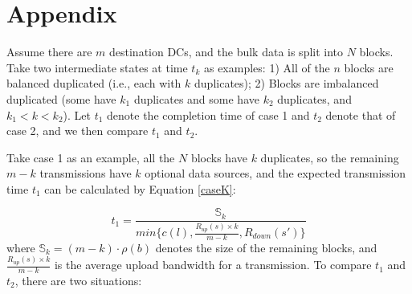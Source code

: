 \section{Appendix}
Assume there are $m$ destination DCs, and the bulk data is split into $N$ blocks.
Take two intermediate states at time $t_k$ as examples: 1) All of the $n$ blocks are balanced duplicated (i.e., each with $k$ duplicates); 2) Blocks are imbalanced duplicated (some have $k_1$ duplicates and some have $k_2$ duplicates, and $k_1<k<k_2$). Let $t_1$ denote the completion time of case 1 and $t_2$ denote that of case 2, and we then compare $t_1$ and $t_2$.
%
%

Take case 1 as an example, all the $N$ blocks have $k$ duplicates, so the remaining $m-k$ transmissions have $k$ optional data sources,
and the expected transmission time $t_1$ can be calculated by Equation \ref{caseK}:

\begin{equation}
\label{caseK}
t_1 = \frac{\mathbb{S}_k}{min\{c(l),\frac{R_{up}(s)\times k}{m-k},R_{down}(s')\}}
\end{equation}
where $\mathbb{S}_k=(m-k)\cdot \rho(b)$ denotes the size of the remaining blocks, and $\frac{R_{up}(s)\times k}{m-k}$ is the average upload bandwidth for a transmission. To compare $t_1$ and $t_2$, there are two situations:

